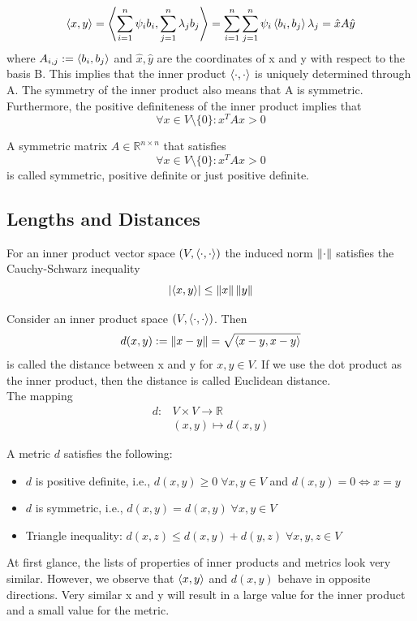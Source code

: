 \[ 
    \left\langle x,y\right\rangle = \left\langle\sum_{i=1}^{n}{\psi_ib_i}, \sum_{j=1}^{n}{\lambda_j b_j}\right\rangle = \sum_{i=1}^{n}{\sum_{j=1}^{n}{\psi_i\left\langle b_i,b_j\right\rangle\lambda_j}} = \hat{x}A\hat{y}
\]where $A_{i,j} := \left\langle b_i,b_j\right\rangle$ and $\hat{x},\hat{y}$ are the coordinates of x and y with respect to the basis B. This implies that the inner product $\left\langle\cdot, \cdot\right\rangle$ is uniquely determined through A. The symmetry of the inner product also means that A is symmetric. Furthermore, the positive definiteness of the inner product implies that
\[ 
    \forall x \in V \setminus\{0\} : x^TAx>0
\]
\begin{definition}
    A symmetric matrix $A \in \mathbb{R}^{n\times n}$ that satisfies 
    \[ 
        \forall x \in V \setminus\{0\} : x^TAx>0 
    \]
    is called symmetric, positive definite or just positive definite. 
\end{definition}

\subsection{Lengths and Distances}
\begin{remark}
    For an inner product vector space $(V, \left\langle\cdot, \cdot\right\rangle)$ the induced norm $\left\lVert\cdot\right\rVert$ satisfies the Cauchy-Schwarz inequality 
    \[ 
        \left\lvert\left\langle x,y\right\rangle\right\rvert \leq \left\lVert x\right\rVert\left\lVert y\right\rVert 
    \]
\end{remark}
\begin{definition}
    Consider an inner product space $(V, \left\langle\cdot, \cdot\right\rangle)$. Then 
    \[ 
        d(x,y):= \left\lVert x-y\right\rVert = \sqrt{\left\langle x-y,x-y\right\rangle}
    \]is called the distance between x and y for $x,y \in V$. If we use the dot product as the inner product, then the distance is called Euclidean distance.\\
    The mapping
    \begin{align*}
        d: &V \times V \longrightarrow \mathbb{R}\\
        &(x,y) \mapsto d(x,y)
    \end{align*}
\end{definition}
A metric $d$ satisfies the following:
\begin{itemize}
    \item $d$ is positive definite, i.e., $d(x,y) \geq 0\; \forall x,y \in V$ and $d(x,y) = 0 \Longleftrightarrow x=y$
    \item $d$ is symmetric, i.e., $d(x,y) = d(x,y)\; \forall x,y \in V$
    \item Triangle inequality: $d(x,z) \leq d(x,y)+d(y,z) \; \forall x,y,z \in V$
\end{itemize}
\begin{remark}
    At first glance, the lists of properties of inner products and metrics look very similar. However, we observe that $\left\langle x,y\right\rangle$ and $d(x,y) $ behave in opposite directions. Very similar x and y will result in a large value for the inner product and a small value for the metric.
\end{remark}

